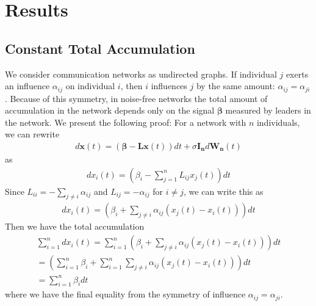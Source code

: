 \documentclass[pageno]{jpaper}
\begin{document}
\section{Results}
\subsection{Constant Total Accumulation}
We consider communication networks as undirected graphs. If individual $j$ exerts an influence $\alpha_{ij}$ on individual $i$, then $i$ influences $j$ by the same amount: $\alpha_{ij}=\alpha_{ji}$. Because of this symmetry, in noise-free networks the total amount of accumulation in the network depends only on the signal $\mathbf{\beta}$ measured by leaders in the network. We present the following proof:
For a network with $n$ individuals, we can rewrite
\begin{align*}
d\mathbf{x}(t)=(\mathbf{\beta}-\mathbf{Lx}(t))dt+\sigma\mathbf{I_n}d\mathbf{W_n}(t)
\end{align*}
as
\begin{align*}
dx_i(t)=(\beta_i-\sum\limits_{j=1}^nL_{ij}x_j(t))dt
\end{align*}
Since $L_{ii}=-\sum\limits_{j\neq i}\alpha_{ij}$ and $L_{ij}=-\alpha_{ij}$ for $i\neq j$, we can write this as
\begin{align*}
dx_i(t)=(\beta_i+\sum\limits_{j\neq i}\alpha_{ij}(x_j(t)-x_i(t)))dt
\end{align*}
Then we have the total accumulation
\begin{align*}
\sum\limits_{i=1}^ndx_i(t)=\sum\limits_{i=1}^n(\beta_i+\sum\limits_{j\neq i}\alpha_{ij}(x_j(t)-x_i(t)))dt\\
=(\sum\limits_{i=1}^n\beta_i+\sum\limits_{i=1}^n\sum\limits_{j\neq i}\alpha_{ij}(x_j(t)-x_i(t)))dt\\
=\sum\limits_{i=1}^n\beta_idt
\end{align*}
where we have the final equality from the symmetry of influence $\alpha_{ij}=\alpha_{ji}$.
\end{document}
